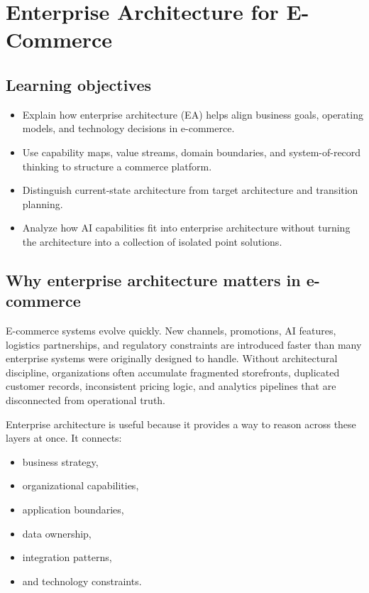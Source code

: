 \chapter{Enterprise Architecture for E-Commerce}

\section{Learning objectives}
\begin{itemize}
  \item Explain how enterprise architecture (EA) helps align business goals, operating models, and technology decisions in e-commerce.
  \item Use capability maps, value streams, domain boundaries, and system-of-record thinking to structure a commerce platform.
  \item Distinguish current-state architecture from target architecture and transition planning.
  \item Analyze how AI capabilities fit into enterprise architecture without turning the architecture into a collection of isolated point solutions.
\end{itemize}

\section{Why enterprise architecture matters in e-commerce}
E-commerce systems evolve quickly.
New channels, promotions, AI features, logistics partnerships, and regulatory constraints are introduced faster than many enterprise systems were originally designed to handle.
Without architectural discipline, organizations often accumulate fragmented storefronts, duplicated customer records, inconsistent pricing logic, and analytics pipelines that are disconnected from operational truth.

Enterprise architecture is useful because it provides a way to reason across these layers at once.
It connects:
\begin{itemize}
  \item business strategy,
  \item organizational capabilities,
  \item application boundaries,
  \item data ownership,
  \item integration patterns,
  \item and technology constraints.
\end{itemize}

